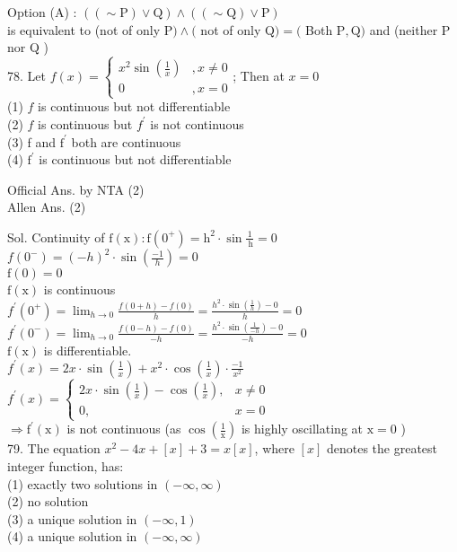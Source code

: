 \documentclass[10pt]{article}
\begin{document}
Option (A) : \(((\sim \mathrm{P}) \vee \mathrm{Q}) \wedge((\sim \mathrm{Q}) \vee \mathrm{P})\)\\
is equivalent to (not of only P\() \wedge(\) not of only Q\() =(\) Both \(\mathrm{P}, \mathrm{Q})\) and (neither P nor Q )\\
78. Let \(f(x)=\left\{\begin{array}{cl}x^{2} \sin \left(\frac{1}{x}\right) & , x \neq 0 \\ 0 & , x=0\end{array}\right.\); Then at \(x=0\)\\
(1) \(f\) is continuous but not differentiable\\
(2) \(f\) is continuous but \(f^{\prime}\) is not continuous\\
(3) f and \(\mathrm{f}^{\prime}\) both are continuous\\
(4) \(\mathrm{f}^{\prime}\) is continuous but not differentiable

Official Ans. by NTA (2)\\
Allen Ans. (2)

Sol. Continuity of \(\mathrm{f}(\mathrm{x}): \mathrm{f}\left(0^{+}\right)=\mathrm{h}^{2} \cdot \sin \frac{1}{\mathrm{~h}}=0\)\\
\(f\left(0^{-}\right)=(-h)^{2} \cdot \sin \left(\frac{-1}{h}\right)=0\)\\
\(\mathrm{f}(0)=0\)\\
\(\mathrm{f}(\mathrm{x})\) is continuous\\
\(f^{\prime}\left(0^{+}\right)=\lim _{h \rightarrow 0} \frac{f(0+h)-f(0)}{h}=\frac{h^{2} \cdot \sin \left(\frac{1}{h}\right)-0}{h}=0\)\\
\(f^{\prime}\left(0^{-}\right)=\lim _{h \rightarrow 0} \frac{f(0-h)-f(0)}{-h}=\frac{h^{2} \cdot \sin \left(\frac{1}{-h}\right)-0}{-h}=0\)\\
\(\mathrm{f}(\mathrm{x})\) is differentiable.\\
\(f^{\prime}(x)=2 x \cdot \sin \left(\frac{1}{x}\right)+x^{2} \cdot \cos \left(\frac{1}{x}\right) \cdot \frac{-1}{x^{2}}\)\\
\(f^{\prime}(x)=\left\{\begin{array}{cl}2 x \cdot \sin \left(\frac{1}{x}\right)-\cos \left(\frac{1}{x}\right), & x \neq 0 \\ 0, & x=0\end{array}\right.\)\\
\(\Rightarrow \mathrm{f}^{\prime}(\mathrm{x})\) is not continuous (as \(\cos \left(\frac{1}{\mathrm{x}}\right)\) is highly oscillating at \(\mathrm{x}=0\) )\\
79. The equation \(x^{2}-4 x+[x]+3=x[x]\), where \([x]\) denotes the greatest integer function, has:\\
(1) exactly two solutions in \((-\infty, \infty)\)\\
(2) no solution\\
(3) a unique solution in \((-\infty, 1)\)\\
(4) a unique solution in \((-\infty, \infty)\)
\end{document}

